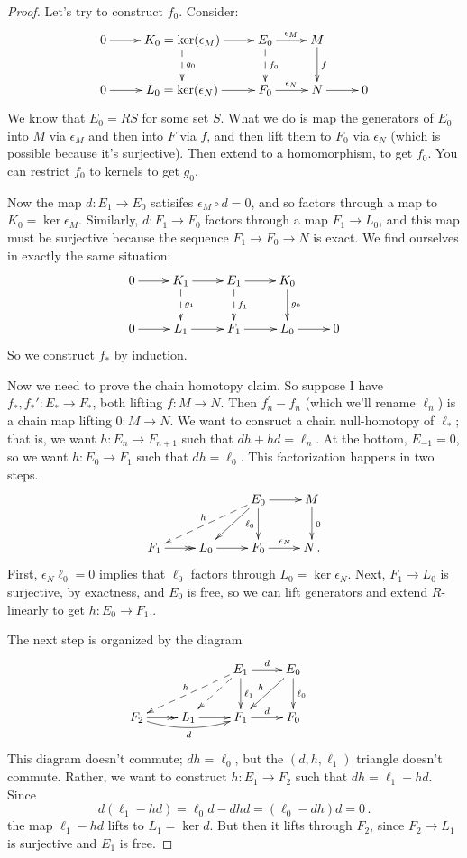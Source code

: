 \begin{proof} Let's try to construct $f_0$. Consider:
\begin{equation*}
\xymatrix{0\ar[r] & K_0=\ker(\epsilon_M)\ar[r]\ar@{-->}[d]^{g_0} & E_0\ar[r]^{\epsilon_M}\ar@{-->}[d]^{f_0} & M\ar[d]^f &\\
0\ar[r] & L_0=\ker(\epsilon_N)\ar[r] & F_0\ar[r]^{\epsilon_N} & N\ar[r] & 0}
\end{equation*}
We know that $E_0=RS$ for some set $S$. What we do is map the generators of $E_0$ into $M$ via $\epsilon_M$ and then into $F$ via $f$, and then lift them to $F_0$ via  $\epsilon_N$ (which is possible because it's surjective). Then extend to
a homomorphism, to get $f_0$. You can restrict $f_0$ to kernels to get $g_0$. 

Now the map $d:E_1\to E_0$ satisifes $\epsilon_M\circ d=0$, and so factors through a map to $K_0=\ker\epsilon_M$. Similarly, $d:F_1\to F_0$ factors through 
a map $F_1\to L_0$, and this map must be surjective because the sequence
$F_1\to F_0\to N$ is exact. We find ourselves in exactly the same situation:
\begin{equation*}
\xymatrix{0\ar[r] & K_1\ar[r]\ar@{-->}[d]^{g_1} & E_1\ar[r]\ar@{-->}[d]^{f_1} & K_0\ar[d]^{g_0} &\\
0\ar[r] & L_1\ar[r] & F_1\ar[r] & L_0\ar[r] & 0}
\end{equation*}
So we construct $f_*$ by induction.

Now we need to prove the chain homotopy claim. So suppose I have $f_\ast,f_\ast':E_\ast\to F_\ast$, both lifting $f:M\to N$. Then $f_n^\prime-f_n$ (which we'll rename $\ell_n$) is a chain map lifting $0:M\to N$. 
We want to consruct a chain null-homotopy of $\ell_\ast$; that is, we want $h:E_n\to F_{n+1}$ such that $dh+hd=\ell_n$. At the bottom, $E_{-1}=0$, so we want
$h:E_0\to F_1$ such that $dh=\ell_0$. This factorization happens in two steps. 
\begin{equation*}
\xymatrix{ & & E_0\ar[d]_{\ell_0}\ar[dl]\ar@{-->}[dll]_h \ar[r] & M\ar[d]^0 \\
F_1\ar@{->>}[r] & L_0\ar[r] & F_0 \ar[r]^{\epsilon_N} & N \,.
}\end{equation*}
First, $\epsilon_N\ell_0=0$ implies that $\ell_0$ factors through $L_0=\ker\epsilon_N$.
Next, $F_1\to L_0$ is surjective, by exactness, and $E_0$ is free, so we can lift generators and extend $R$-linearly to get $h:E_0\to F_1$.. 

The next step is organized by the diagram
\begin{equation*}
\xymatrix{ & & E_1\ar[r]^d\ar[d]^{\ell_1}\ar@{-->}[dl]\ar@{-->}[dll]_h & 
E_0\ar[d]^{\ell_0}\ar[dl]_h & \\
F_2\ar@{->>}[r]\ar@/_8pt/[rr]_d & L_1\ar[r] & F_1\ar[r]^d & F_0}
\end{equation*}
This diagram doesn't commute; $dh=\ell_0$, but the $(d,h,\ell_1)$ triangle
doesn't commute. Rather, we want to construct 
$h:E_1\to F_2$ such that $dh=\ell_1-hd$. Since 
\[
d(\ell_1-hd)=\ell_0d-dhd=(\ell_0-dh)d=0\,.
\]
the map $\ell_1-hd$ lifts to $L_1=\ker d$. But then it lifts through $F_2$, 
since $F_2\to L_1$ is surjective and $E_1$ is free. 


\end{proof}
